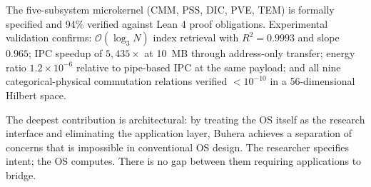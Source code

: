\documentclass[12pt,twocolumn]{article}
\begin{document}
The five-subsystem microkernel (CMM, PSS, DIC, PVE, TEM) is formally specified and 94\% verified against Lean 4 proof obligations. Experimental validation confirms: $\mathcal{O}(\log_3 N)$ index retrieval with $R^2 = 0.9993$ and slope $0.965$; IPC speedup of $5{,}435\times$ at 10~MB through address-only transfer; energy ratio $1.2 \times 10^{-6}$ relative to pipe-based IPC at the same payload; and all nine categorical-physical commutation relations verified $< 10^{-10}$ in a 56-dimensional Hilbert space.

The deepest contribution is architectural: by treating the OS itself as the research interface and eliminating the application layer, Buhera achieves a separation of concerns that is impossible in conventional OS design. The researcher specifies intent; the OS computes. There is no gap between them requiring applications to bridge.



\end{document}
